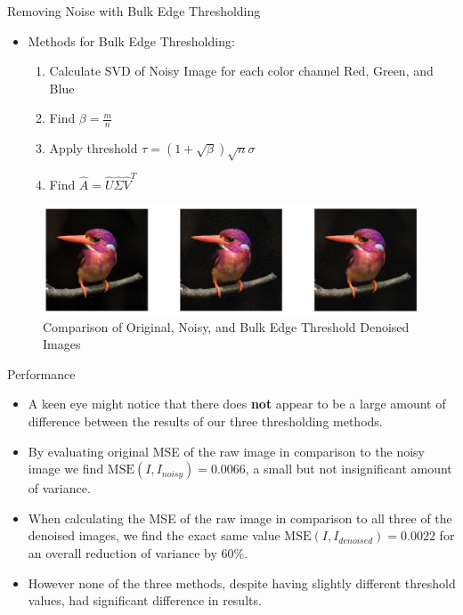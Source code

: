 \documentclass[aspectratio=169,xcolor=dvipsnames]{beamer}
\begin{document}
	
	\begin{frame}{Removing Noise with Bulk Edge Thresholding}
		\begin{itemize}
			\item Methods for Bulk Edge Thresholding: 
			\begin{enumerate}
				\item Calculate SVD of Noisy Image for each color channel Red, Green, and Blue
				\item Find $\beta = \frac{m}{n}$
				\item Apply threshold $\tau = (1+\sqrt{\beta})\sqrt{n}\sigma$
				\item Find $\hat{A} = \hat{U}\hat{\Sigma}\hat{V}^T$
			\end{enumerate}
		\end{itemize}
		\begin{figure}
			\includegraphics[scale=0.4]{BulkDenoise.png}
			\caption{Comparison of Original, Noisy, and Bulk Edge Threshold Denoised Images}
		\end{figure}
	\end{frame}
	
	
	\begin{frame}{Performance}
		\begin{itemize}
			\item A keen eye might notice that there does \textbf{not} appear to be a large amount of difference between the results of our three thresholding methods.
			\item By evaluating original MSE of the raw image in comparison to the noisy image we find $\text{MSE}(I, I_{noisy}) = 0.0066$, a small but not insignificant amount of variance.
			\item When calculating the MSE of the raw image in comparison to all three of the denoised images, we find the exact same value $\text{MSE}(I, I_{denoised}) = 0.0022$ for an overall reduction of variance by 60\%. 
			\item However none of the three methods, despite having slightly different threshold values, had significant difference in results.
		\end{itemize}
	\end{frame}
	
\end{document}
